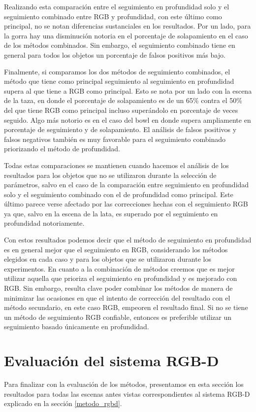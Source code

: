 Realizando esta comparación entre el seguimiento en profundidad solo y el seguimiento combinado entre RGB y profundidad, con este último como principal, no se notan diferencias sustanciales en los resultados. Por un lado, para la gorra hay una disminución notoria en el porcentaje de solapamiento en el caso de los métodos combinados. Sin embargo, el seguimiento combinado tiene en general para todos los objetos un porcentaje de falsos positivos más bajo.

Finalmente, si comparamos los dos métodos de seguimiento combinados, el método que tiene como principal seguimiento al seguimiento en profundidad supera al que tiene a RGB como principal. Esto se nota por un lado con la escena de la taza, en donde el porcentaje de solapamiento es de un 65\% contra el 50\% del que tiene RGB como principal incluso superándolo en porcentaje de veces seguido. Algo más notorio es en el caso del bowl en donde supera ampliamente en porcentaje de seguimiento y de solapamiento. El análisis de falsos positivos y falsos negativos también es muy favorable para el seguimiento combinado priorizando el método de profundidad.

Todas estas comparaciones se mantienen cuando hacemos el análisis de los resultados para los objetos que no se utilizaron durante la selección de parámetros, salvo en el caso de la comparación entre seguimiento en profundidad solo y el seguimiento combinado con el de profundidad como principal. Este último parece verse afectado por las correcciones hechas con el seguimiento RGB ya que, salvo en la escena de la lata, es superado por el seguimiento en profundidad notoriamente.

Con estos resultados podemos decir que el método de seguimiento en profundidad es en general mejor que el seguimiento en RGB, considerando los métodos elegidos en cada caso y para los objetos que se utilizaron durante los experimentos. En cuanto a la combinación de métodos creemos que es mejor utilizar aquella que prioriza el seguimiento en profundidad y es mejorado con RGB. Sin embargo, resulta clave poder combinar los métodos de manera de minimizar las ocasiones en que el intento de corrección del resultado con el método secundario, en este caso RGB, empeoren el resultado final. Si no se tiene un método de seguimiento RGB confiable, entonces es preferible utilizar un seguimiento basado únicamente en profundidad.


\section{Evaluación del sistema RGB-D}\label{sec:evaluacion_rgbd}
Para finalizar con la evaluación de los métodos, presentamos en esta sección los resultados para todas las escenas antes vistas correspondientes al sistema RGB-D explicado en la sección \ref{metodo_rgbd}.

